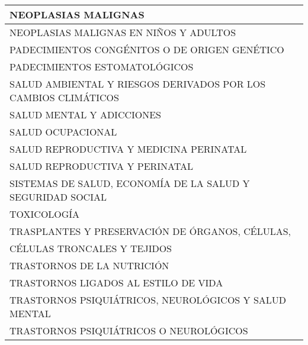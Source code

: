 \documentclass[9.5pt]{article}
\begin{document}
\begin{table}
\begin{tabular}{| l |}
NEOPLASIAS MALIGNAS			\\ \hline
NEOPLASIAS MALIGNAS EN NIÑOS Y ADULTOS			\\ \hline
PADECIMIENTOS CONGÉNITOS O DE ORIGEN GENÉTICO			\\ \hline
PADECIMIENTOS ESTOMATOLÓGICOS			\\ \hline
SALUD AMBIENTAL Y RIESGOS DERIVADOS POR LOS CAMBIOS CLIMÁTICOS			\\ \hline
SALUD MENTAL Y ADICCIONES			\\ \hline
SALUD OCUPACIONAL			\\ \hline
SALUD REPRODUCTIVA Y MEDICINA PERINATAL			\\ \hline
SALUD REPRODUCTIVA Y PERINATAL			\\ \hline
SISTEMAS DE SALUD, ECONOMÍA DE LA SALUD Y SEGURIDAD SOCIAL			\\ \hline
TOXICOLOGÍA			\\ \hline
TRASPLANTES Y PRESERVACIÓN DE ÓRGANOS, CÉLULAS,\\ CÉLULAS TRONCALES Y TEJIDOS			\\ \hline
TRASTORNOS DE LA NUTRICIÓN			\\ \hline
TRASTORNOS LIGADOS AL ESTILO DE VIDA			\\ \hline
TRASTORNOS PSIQUIÁTRICOS, NEUROLÓGICOS Y SALUD MENTAL			\\ \hline
TRASTORNOS PSIQUIÁTRICOS O NEUROLÓGICOS			\\ \hline


  
\end{tabular}
\end{table}
\end{document}
